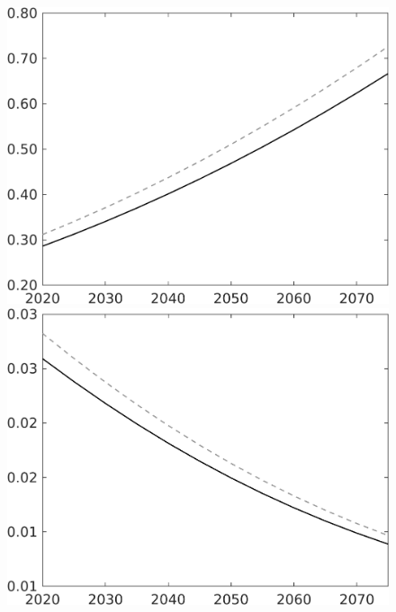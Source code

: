 \documentclass[12pt]{article}
\begin{document}
\begin{figure}[h!!]
\begin{minipage}[]{0.32\textwidth}
	\end{minipage}	
	\begin{minipage}[]{0.32\textwidth}
		\includegraphics[width=1\textwidth]{../../codding_model/own_basedOnFried/optimalPol_010922_revision/figures/all_13Sept22/CompTaul_LFBAU_Reg0_F_spillover0_nsk1_xgr1_knspil1_sep1_countec0_GovRev0_etaa0.79_lgd0.png}
	\end{minipage}	
	\begin{minipage}[]{0.32\textwidth}
		\includegraphics[width=1\textwidth]{../../codding_model/own_basedOnFried/optimalPol_010922_revision/figures/all_13Sept22/CompTaul_LFBAU_Reg0_G_spillover0_nsk1_xgr1_knspil1_sep1_countec0_GovRev0_etaa0.79_lgd0.png}

\end{minipage}
\end{figure}
\end{document}
